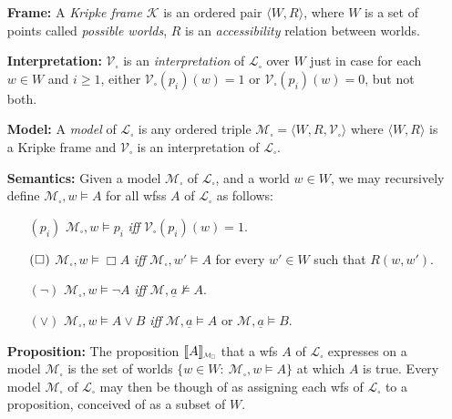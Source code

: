 \documentclass[a4paper, 11pt]{article} %
\newcommand{\tuple}[1]{\langle#1\rangle} %
\newcommand{\set}[1]{\lbrace#1\rbrace} %
\newcommand{\interpret}[1]{\llbracket#1\rrbracket} %
\newcommand{\V}[0]{\mathcal{V}}
\renewcommand{\L}[0]{\mathcal{L}}
\newcommand*{\Scale}[2][4]{\scalebox{#1}{$#2$}}%
\begin{document}
\begin{enumerate}[leftmargin=1.2in,labelsep=.15in] %
\item[\bf Frame:] A \textit{Kripke frame} $\mathcal{K}$ is an ordered pair $\tuple{W,R}$, where $W$ is a set of points called \textit{possible worlds}, $R$ is an \textit{accessibility} relation between worlds.
\item[\bf Interpretation:] $\V_\square$ is an \textit{interpretation} of $\L_\square$ over $W$ just in case for each $w\in W$ and $i\geq1$, either $\V_\square(p_i)(w)=1$ or $\V_\square(p_i)(w)=0$, but not both.
\item[\bf Model:] A \textit{model} of $\L_\square$ is any ordered triple $\mathcal{M}_\square=\tuple{W,R,\V_\square}$ where $\tuple{W,R}$ is a Kripke frame and $\V_\square$ is an interpretation of $\L_\square$.
\item[\bf Semantics:] Given a model $\mathcal{M}_\square$ of $\L_\square$, and a world $w\in W$, we may recursively define $\mathcal{M}_\square,w\vDash A$ for all wfss $A$ of $\L_\square$ as follows:
\begin{small}
\begin{itemize}[leftmargin=.36in]
\item[$(p_i)$] $\mathcal{M}_\square,w\vDash  p_i$ \textit{iff} $\V_\square(p_i)(w)=1$.
\item[$(\hspace{.3pt}\Box\hspace{.3pt})$] $\mathcal{M}_\square,w\vDash  \Box A$ \textit{iff} $\mathcal{M}_\square,w'\vDash A$ for every $w'\in W$ such that $R(w,w')$.
\item[$(\neg)$] $\mathcal{M}_\square,w\vDash  \neg A$ \textit{iff} $\mathcal{M},\underline{a}\nvDash A$.
\item[$(\vee)$] $\mathcal{M}_\square,w\vDash  A\vee B$ \textit{iff} $\mathcal{M},\underline{a}\vDash  A$ or $\mathcal{M},\underline{a}\vDash  B$.
\end{itemize}
\end{small}
\item[\bf Proposition:] The proposition $\interpret{A}_{\Scale[0.5]{\mathcal{M}_\square}}$ that a wfs ${A}$ of $\L_\square$ expresses on a model $\mathcal{M}_\square$ is the set of worlds $\set{w\in W: ~\mathcal{M}_\square,w\vDash  A}$ at which ${A}$ is true. Every model $\mathcal{M}_\square$ of $\L_\square$ may then be though of as assigning each wfs of $\L_\square$ to a proposition, conceived of as a subset of $W$.
\end{enumerate}
\end{document}
